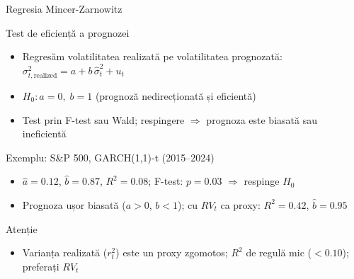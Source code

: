 \documentclass[9pt, aspectratio=169, t]{beamer}
\begin{document}
\begin{frame}{Regresia Mincer-Zarnowitz}
    \small
        \setlength{\abovedisplayskip}{1pt}\setlength{\belowdisplayskip}{1pt}
        \vspace{-0.4cm}
        \begin{block}{Test de eficiență a prognozei}
            \begin{itemize}
                \item Regresăm volatilitatea realizată pe volatilitatea prognozată:
                $\sigma_{t,\text{realized}}^2 = a + b \, \hat{\sigma}_t^2 + u_t$
            \end{itemize}
        \end{block}
        \vspace{-0.2cm}
        \begin{defn}[Ipoteze]
            \begin{itemize}
                \item $H_0: a = 0, \; b = 1$ (prognoză nedirecționată și eficientă)
                \item Test prin F-test sau Wald; respingere $\Rightarrow$ prognoza este biasată sau ineficientă
            \end{itemize}
        \end{defn}
        \vspace{-0.2cm}
        \begin{exampleblock}{Exemplu: S\&P 500, GARCH(1,1)-t (2015--2024)}
            \begin{itemize}
                \item $\hat{a} = 0.12$, $\hat{b} = 0.87$, $R^2 = 0.08$; F-test: $p = 0.03$ $\Rightarrow$ respinge $H_0$
                \item Prognoza ușor biasată ($a > 0$, $b < 1$); cu $RV_t$ ca proxy: $R^2 = 0.42$, $\hat{b} = 0.95$
            \end{itemize}
        \end{exampleblock}
        \vspace{-0.2cm}
        \begin{alertblock}{Atenție}
            \begin{itemize}
                \item Varianța realizată ($r_t^2$) este un proxy zgomotos; $R^2$ de regulă mic ($< 0.10$); preferați $RV_t$
            \end{itemize}
        \end{alertblock}
\end{frame}
\end{document}

